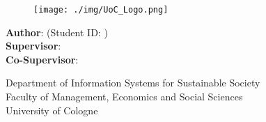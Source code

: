 \makeatletter
\begin{titlepage}
    \begin{center}
        \vspace*{1cm}

        \Large
        \textbf{\@title}

        \vspace{1.5cm}

        \thesistype{}

        \vspace{1cm}

        \begin{figure}[htbp]
             \centering
             \texttt{[image: ./img/UoC\_Logo.png]}
        \end{figure}

        \vspace{1cm}

        \large
        \textbf{Author}: \thesisauthor{} (Student ID: \studentID{})\\
        \large
        \textbf{Supervisor}: \supervisor{}\\
        \large
        \textbf{Co-Supervisor}: \cosupervisor{}

        \vspace{1cm}
        \large
        Department of Information Systems for Sustainable Society\\
        Faculty of Management, Economics and Social Sciences\\
        University of Cologne\\

        \vspace{1cm}
        \@date

    \end{center}
\end{titlepage}
\makeatother
\clearpage
